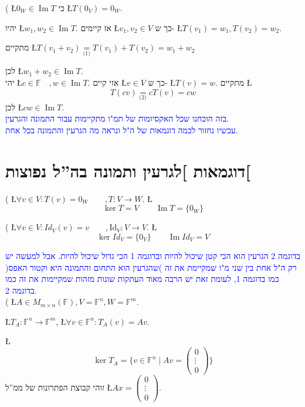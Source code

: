 \documentclass[english,hebrew]{article}
\begin{document}
{\endL}( \L{$0_{W}\in\operatorname{Im}T$} כי \L{$T(0_{V})=0_{W}$}.

יהיו \L{$w_{1},w_{2}\in\operatorname{Im}T$}. אז קיימים \L{$v_{1},v_{2}\in V$}
כך ש- \L{$T(v_{1})=w_{1},T(v_{2})=w_{2}$}.

מתקיים \L{$T(v_{1}+v_{2})\underset{\text{(1)}}{=}T(v_{1})+T(v_{2})=w_{1}+w_{2}$}

לכן \L{$w_{1}+w_{2}\in\operatorname{Im}T$}.\\

יהי \L{$c\in\mathbb{F}\quad,w\in\operatorname{Im}T$}. אזי קיים \L{$v\in V$}
כך ש- \L{$T(v)=w$}. מתקיים \L{%
\[
T(cv)\underset{\text{(2)}}{=}cT(v)=cw
\]
}%
לכן \L{$cw\in\operatorname{Im}T$}.\\

\textcolor{blue}{בזה הוכחנו שכל האקסיומות של תמ"ו מתקיימות עבור התמונה
והגרעין.}\\

\textcolor{blue}{עכשיו נחזור לכמה דוגמאות של ה"ל ונראה מה הגרעין
והתמונה בכל אחת.}

\section{דוגמאות {]}לגרעין ותמונה בה\textquotedblright ל נפוצות{[}}

{\endL}( \L{$\forall v\in V:T(v)=0_{W}\qquad,T:V\to W$}.
\L{%
\[
\ker T=V\qquad\operatorname{Im}T=\{0_{W}\}
\]
}%

{\endL}( \L{$\forall v\in V:Id_{V}(v)=v\qquad,\text{Id}_{V}:V\to V$}.
\L{%
\[
\ker Id_{V}=\{0_{V}\}\qquad\operatorname{Im}Id_{V}=V
\]
}%

\textcolor{blue}{בדוגמה 2 הגרעין הוא הכי קטן שיכול להיות ובדוגמה 1
הכי גדול שיכול להיות. אבל למעשה יש רק ה"ל אחת בין שני מ"ו שמקיימת
את זה )שהגרעין הוא התחום והתמונה היא וקטור האפס( כמו בדוגמה 1, לעומת
זאת יש הרבה מאוד העתקות שונות מזהות שמקיימות את זה כמו בדוגמה 2.}\\

{\endL}( \L{$A\in M_{m\times n}(\mathbb{F}),V=\mathbb{F}^{n},W=\mathbb{F}^{m}$}.

\L{$T_{A}:\mathbb{F}^{n}\to\mathbb{F}^{m}$},\qquad{} \L{$\forall v\in\mathbb{F}^{n}:T_{A}(v)=Av$}.

\L{%
\[
\ker T_{A}=\{v\in\mathbb{F}^{n}\mid Av=\begin{pmatrix}0\\
\vdots\\
0
\end{pmatrix}\}
\]
}%
זוהי קבוצת הפתרונות של ממ\textquotedblright ל \L{$Ax=\begin{pmatrix}0\\
\vdots\\
0
\end{pmatrix}$}.
\end{document}
